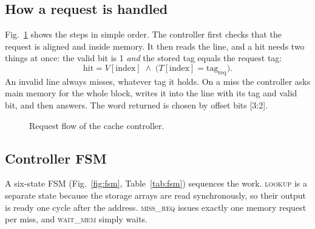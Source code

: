\documentclass[conference]{IEEEtran}
\begin{document}
\subsection{How a request is handled}
Fig.~\ref{fig:flow} shows the steps in simple order. The controller first checks that the request is aligned and inside memory. It then reads the line, and a hit needs two things at once: the valid bit is 1 \emph{and} the stored tag equals the request tag:
\begin{equation}
\text{hit}=V[\text{index}]\;\wedge\;\bigl(T[\text{index}]=\text{tag}_{\text{req}}\bigr).\label{eq:hit}
\end{equation}
An invalid line always misses, whatever tag it holds. On a miss the controller asks main memory for the whole block, writes it into the line with its tag and valid bit, and then answers. The word returned is chosen by offset bits [3:2].

\begin{figure}[t]
\centering
{}
\caption{Request flow of the cache controller.}\label{fig:flow}
\end{figure}

\subsection{Controller FSM}
A six-state FSM (Fig.~\ref{fig:fsm}, Table~\ref{tab:fsm}) sequences the work. \textsc{lookup} is a separate state because the storage arrays are read synchronously, so their output is ready one cycle after the address. \textsc{miss\_req} issues exactly one memory request per miss, and \textsc{wait\_mem} simply waits.
\end{document}
